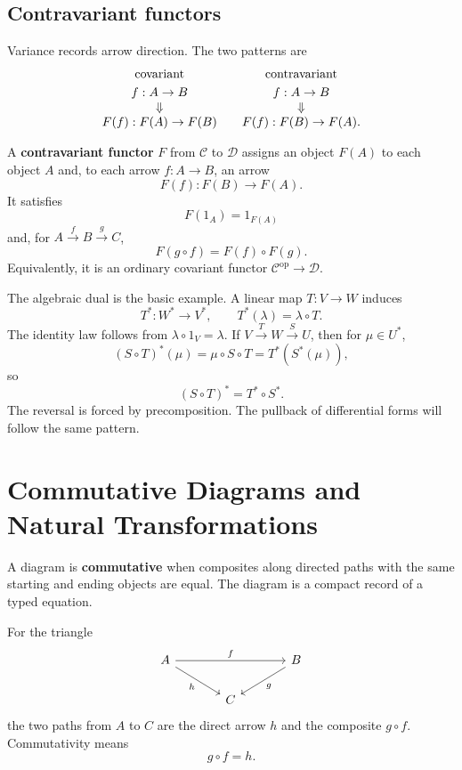 \subsection{Contravariant functors}
Variance records arrow direction. The two patterns are
\[
\begin{array}{c@{\qquad}c}
\text{covariant}&\text{contravariant}\\[1mm]
f:A\to B&f:A\to B\\
\Downarrow&\Downarrow\\
F(f):F(A)\to F(B)&F(f):F(B)\to F(A).
\end{array}
\]

\begin{definition}
A \textbf{contravariant functor} $F$ from $\mathcal C$ to $\mathcal D$
assigns an object $F(A)$ to each object $A$ and, to each arrow $f:A\to B$,
an arrow
\[
F(f):F(B)\longrightarrow F(A).
\]
It satisfies
\[
F(1_A)=1_{F(A)}
\]
and, for $A\xrightarrow{f}B\xrightarrow{g}C$,
\[
\boxed{F(g\circ f)=F(f)\circ F(g).}
\]
Equivalently, it is an ordinary covariant functor
$\mathcal C^{\mathrm{op}}\to\mathcal D$.
\end{definition}

The algebraic dual is the basic example. A linear map $T:V\to W$ induces
\[
T^*:W^*\longrightarrow V^*,
\qquad
T^*(\lambda)=\lambda\circ T.
\]
The identity law follows from $\lambda\circ1_V=\lambda$. If
$V\xrightarrow{T}W\xrightarrow{S}U$, then for $\mu\in U^*$,
\[
(S\circ T)^*(\mu)=\mu\circ S\circ T
=T^*(S^*(\mu)),
\]
so
\[
(S\circ T)^*=T^*\circ S^*.
\]
The reversal is forced by precomposition. The pullback of differential forms
will follow the same pattern.

\section{Commutative Diagrams and Natural Transformations}
A diagram is \textbf{commutative} when composites along directed paths with
the same starting and ending objects are equal. The diagram is a compact
record of a typed equation.

For the triangle
\[
\begin{tikzcd}[column sep=large]
A \arrow[rr,"f"] \arrow[dr,"h"'] && B \arrow[dl,"g"]\\
& C &
\end{tikzcd}
\]
the two paths from $A$ to $C$ are the direct arrow $h$ and the composite
$g\circ f$. Commutativity means
\[
g\circ f=h.
\]

